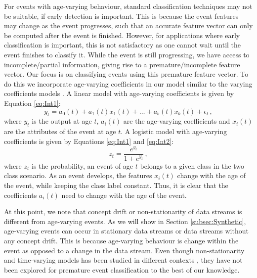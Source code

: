 \documentclass[a4paper,11pt]{article}
\begin{document}
For events with age-varying behaviour, standard classification techniques may not be suitable, if early detection is important. This is because the event features may change as the event progresses, such that an accurate feature vector can only be computed after the event is finished. However, for applications where early classification is important, this is not satisfactory as one cannot wait until the event finishes to classify it. While the event is still progressing, we have access to incomplete/partial information, giving rise to a premature/incomplete feature vector. Our focus is on classifying events using this premature feature vector. To do this we incorporate age-varying coefficients in our model similar to the varying coefficients models \cite{hastie1993varying}. A linear model with age-varying coefficients is given by Equation \eqref{eq:Int1}:
\begin{equation}\label{eq:Int1}
	y_t = a_0(t) + a_1(t) x_1(t) + \dots + a_b(t)x_b(t) + \epsilon_t \, ,
\end{equation}
where $y_t$ is the output at age $t$, $a_i(t)$ are the age-varying coefficients and $x_i(t)$ are the attributes of the event at age $t$. A logistic model with age-varying coefficients is given by Equations \eqref{eq:Int1} and \eqref{eq:Int2}:
\begin{equation}\label{eq:Int2}
	z_t = \frac{e^{y_t}}{1 + e^{y_t}} \, ,
\end{equation}
where $z_t$ is the probability, an event of age $t$ belongs to a given class in the two class scenario. As an event develops, the features $x_i(t)$ change with the age of the event, while keeping the class label constant. Thus, it is clear that the coefficients $a_i(t)$ need to change with the age of the event.

At this point, we note that concept drift \cite{widmer1996learning, tsymbal2004problem,klinkenberg2000detecting,gama2014survey} or non-stationarity of data streams \cite{hulten2001mining, gama2010knowledge, gaber2005mining} is different from age-varying events. As we will show in Section \ref{subsec:Synthetic}, age-varying events can occur in stationary data streams or data streams without any concept drift. This is because age-varying behaviour is change within the event as opposed to a change in the data stream. Even though non-stationarity and time-varying models has been studied in different contexts \cite{harvey1989time, wang1998cluster, hoover1998nonparametric}, they have not been explored for premature event classification to the best of our knowledge.
\end{document}
